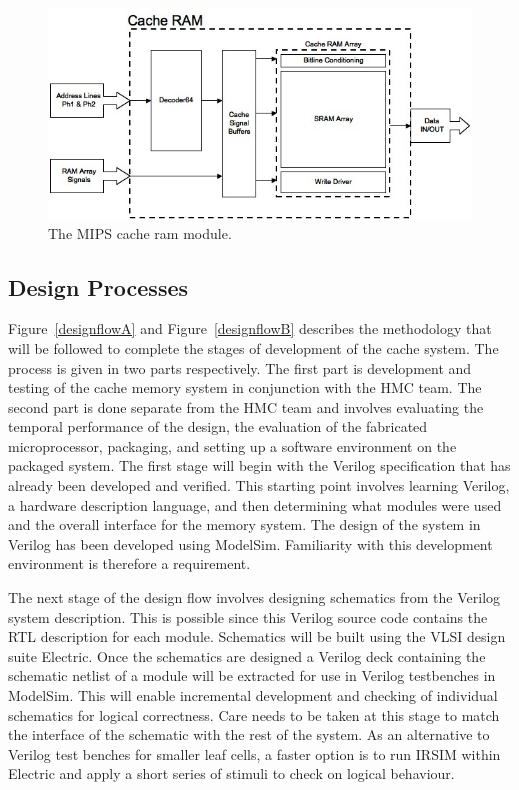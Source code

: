 \begin{figure}
\centering 
\includegraphics[width=\textwidth]{cacheram.jpg}
\caption{The MIPS cache ram module.}
\label{cacheram}
\end{figure}

\subsection{Design Processes}

Figure~\ref{designflowA} and Figure~\ref{designflowB} describes the methodology that will be followed to complete the stages of development of the cache system. The process is given in two parts respectively. The first part is development and testing of the cache memory system in conjunction with the HMC team. The second part is done separate from the HMC team and involves evaluating the temporal performance of the design, the evaluation of the fabricated microprocessor, packaging, and setting up a software environment on the packaged system. The first stage will begin with the Verilog specification that has already been developed and verified. This starting point involves learning Verilog, a hardware description language, and then determining what modules were used and the overall interface for the memory system. The design of the system in Verilog has been developed using ModelSim. Familiarity with this development environment is therefore a requirement.

The next stage of the design flow involves designing schematics from the Verilog system description. This is possible since this Verilog source code contains the RTL description for each module. Schematics will be built using the VLSI design suite Electric. Once the schematics are designed a Verilog deck containing the schematic netlist of a module will be extracted for use in Verilog testbenches in ModelSim. This will enable incremental development and checking of individual schematics for logical correctness. Care needs to be taken at this stage to match the interface of the schematic with the rest of the system. As an alternative to Verilog test benches for smaller leaf cells, a faster option is to run IRSIM within Electric and apply a short series of stimuli to check on logical behaviour.

